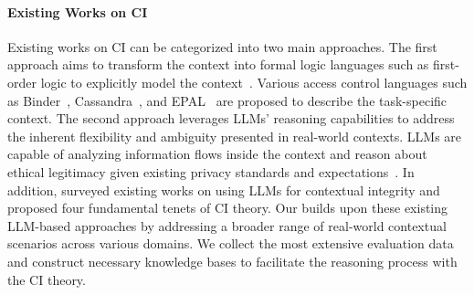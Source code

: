 \paragraph{Existing Works on CI}
Existing works on CI can be categorized into two main approaches.
The first approach aims to transform the context into formal logic languages such as first-order logic to explicitly model the context~\cite{Barth-2006-CI}.
Various access control languages such as Binder~\cite{DeTreville-Binder-2002}, Cassandra~\cite{becker2004cassandra}, and EPAL~\cite{Ashley-EPAL-2003} are proposed to describe the task-specific context.
The second approach leverages LLMs' reasoning capabilities to address the inherent flexibility and ambiguity presented in real-world contexts.
LLMs are capable of analyzing information flows inside the context and reason about ethical legitimacy given existing privacy standards and expectations~\cite{mireshghallah2024can, fan2024goldcoin,li-2024-privacychecklist, shao2024privacylens}.
In addition, \citet{shvartzshnaider2025position} surveyed existing works on using LLMs for contextual integrity and proposed four fundamental tenets
of CI theory.
Our \name builds upon these existing LLM-based approaches by addressing a broader range of real-world contextual scenarios across various domains.
We collect the most extensive evaluation data and construct necessary knowledge bases to facilitate the reasoning process with the CI theory.
